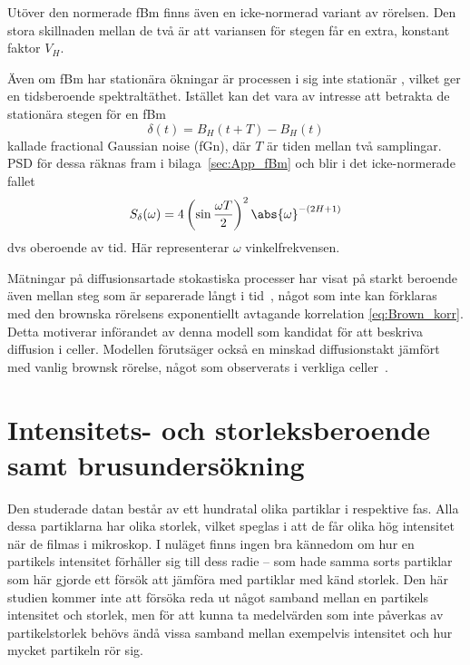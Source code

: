 Utöver den normerade fBm finns även en icke-normerad variant av rörelsen. Den stora skillnaden mellan de två är att variansen för stegen får en extra, konstant faktor $V_H$.

Även om fBm har stationära ökningar är processen i sig inte stationär \cite{Flandrin_fBmspektrum1989}, vilket ger en tidsberoende spektraltäthet. Istället kan det vara av intresse att betrakta de stationära stegen för en fBm
\begin{equation}
    \delta(t)=B_H(t+T)-B_H(t)
\end{equation} 
kallade fractional Gaussian noise (fGn), där $T$ är tiden mellan två samplingar. PSD för dessa räknas fram i bilaga~\ref{sec:App_fBm} och blir i det icke-normerade fallet
\begin{equation}
    S_{\delta}(\omega)=4\left(\sin{\frac{\omega T}{2}}\right)^2 \abs{\omega}^{-(2H+1)}
\end{equation}
dvs oberoende av tid. Här representerar $\omega$ vinkelfrekvensen.

Mätningar på diffusionsartade stokastiska processer har visat på starkt beroende även mellan steg som är separerade långt i tid~\cite{Mandelbrot_fBm1968}, något som inte kan förklaras med den brownska rörelsens exponentiellt avtagande korrelation  \eqref{eq:Brown_korr}. Detta motiverar införandet av denna modell som kandidat för att beskriva diffusion i celler. Modellen förutsäger också en minskad diffusionstakt jämfört med vanlig brownsk rörelse, något som observerats i verkliga celler~\cite{Hofling&Franosch2013}.
    


\section{Intensitets- och storleksberoende samt brusundersökning}

Den studerade datan består av ett hundratal olika partiklar i respektive fas. Alla dessa partiklarna har olika storlek, vilket speglas i att de får olika hög intensitet när de filmas i mikroskop. I nuläget finns ingen bra kännedom om hur en partikels intensitet förhåller sig till dess radie -- \cite{Parry_etal2014} som hade samma sorts partiklar som här gjorde ett försök att jämföra med partiklar med känd storlek. Den här studien kommer inte att försöka reda ut något samband mellan en partikels intensitet och storlek, men för att kunna ta medelvärden som inte påverkas av partikelstorlek behövs ändå vissa samband mellan exempelvis intensitet och hur mycket partikeln rör sig. 

